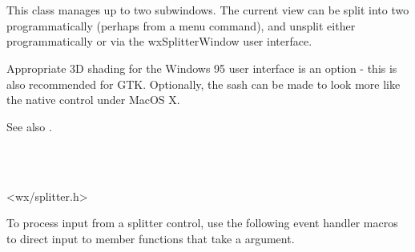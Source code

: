 \section{}\label{wxsplitterwindow}


This class manages up to two subwindows. The current view can be
split into two programmatically (perhaps from a menu command), and unsplit
either programmatically or via the wxSplitterWindow user interface.

Appropriate 3D shading for the Windows 95 user interface is an option -
this is also recommended for GTK. Optionally, the sash can be made to
look more like the native control under MacOS X.


\begin{twocollist}\itemsep=0pt
\end{twocollist}

See also .


\\
\\


<wx/splitter.h>


To process input from a splitter control, use the following event handler
macros to direct input to member functions that take a 
 argument.


